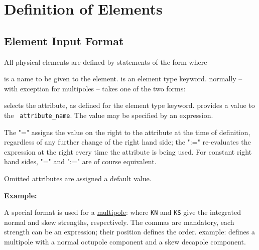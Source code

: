 
\chapter{Definition of Elements}
\label{chap:element-definition}

\section{Element Input Format}
\label{sec:element-input}

All physical elements are defined by statements of the form 
where 
\begin{madlist}
   is a name to be given to the element.
   is an element type keyword.  
   normally -- with exception for multipoles -- takes one of the two forms:
    \begin{madlist}
       selects the attribute,
      as defined for the element type keyword.   
       provides a value to the {\tt
        attribute\_name}. The value may be specified by an expression.
    \end{madlist}
    The "=" assigns the value on the right to
    the attribute at the time of definition, regardless of any
    further change of the right hand side; the ":=" re-evaluates
    the expression at the right every time the attribute is being
    used. For constant right hand sides, "=" and ":=" are of
    course equivalent.  
\end{madlist}

Omitted attributes are assigned a default value.

{\bf Example:} 

A special format is used for a \hyperref[sec:multipole]{multipole}: 
where {\tt KN} and {\tt KS} give the integrated normal and skew strengths,
respectively. The commas are mandatory, each strength can be an
expression; their position defines the order. example:  
defines a multipole with a normal octupole component and a skew decapole
component.  

